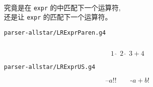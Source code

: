 \begin{frame}{}
  \begin{center}
     \\[10pt]
    究竟是在 \texttt{expr} 的中匹配下一个运算符, \\[15pt]
    还是让 \texttt{expr} 的匹配下一个运算符。
  \end{center}
\end{frame}

\begin{frame}{}
  \begin{center}
    \texttt{parser-allstar/LRExprParen.g4}
  \end{center}

  \vspace{0.30cm}
  \begin{columns}
      \pause
  \end{columns}
\end{frame}

\begin{frame}{}
  \begin{columns}
      \pause
  \end{columns}

  \vspace{0.80cm}
  \[
    1 \;\hat{\;}\; 2 \;\hat{\;}\; 3 + 4
  \]
\end{frame}

\begin{frame}{}
  \begin{center}
    \texttt{parser-allstar/LRExprUS.g4}

    \vspace{0.30cm}
  \end{center}
\end{frame}

\begin{frame}{}
  \begin{center}
  \end{center}

  \[
    \text{--}a!! \qquad \text{-}a+b!
  \]
\end{frame}

